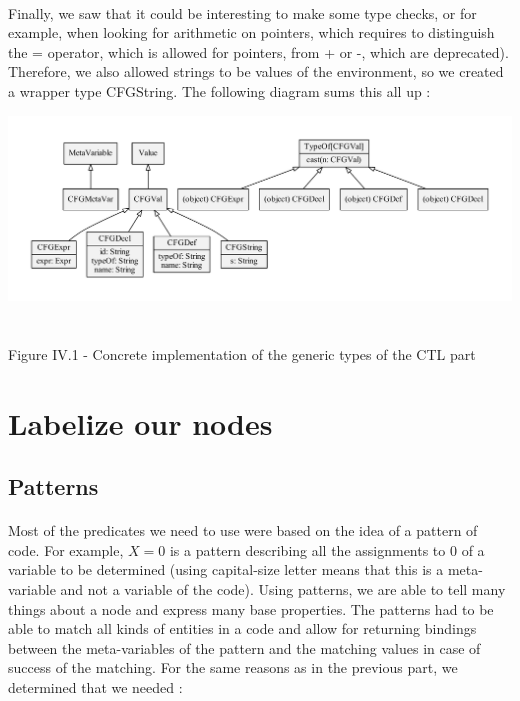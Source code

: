\documentclass{report}
\begin{document}
\paragraph{}
\hspace{4mm}Finally, we saw that it could be interesting to make some type checks, or for example, when looking for arithmetic on pointers, which requires to distinguish the = operator, which is allowed for pointers, from + or -, which are deprecated).
Therefore, we also allowed strings to be values of the environment, so we created a wrapper type CFGString. The following diagram sums this all up :

\begin{center}
\includegraphics[scale=0.65]{data/merge_types}
~\\~\\Figure IV.1 - Concrete implementation of the generic types of the CTL part
\end{center}

\section{Labelize our nodes}

\subsection{Patterns}

\paragraph{}
\hspace{4mm}Most of the predicates we need to use were based on the idea of a pattern of code. For example, $X = 0$ is a pattern describing all the assignments to 0
of a variable to be determined (using capital-size letter means that this is a meta-variable and not a variable of the code). Using patterns, we are able 
to tell many things about a node and express many base properties. The patterns had to be able to match all kinds of entities in a code and allow for 
returning bindings between the meta-variables of the pattern and the matching values in case of success of the matching. For the same reasons as in the
previous part, we determined that we needed :
\end{document}
